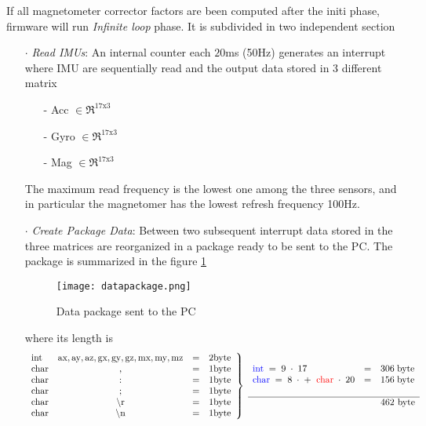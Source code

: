 If all magnetometer corrector factors are been computed after the initi phase, firmware will run \textit{Infinite loop} phase. It is subdivided in two independent section
\begin{enumerate}
\item[$\cdot$] \textit{Read IMUs}: An internal counter each $20$ms (50Hz) generates an interrupt where IMU are sequentially read and the output data stored in 3 different matrix
                          \begin{enumerate}
                          \item[-] Acc $\in \Re ^{17 \text{x} 3}$
                          \item[-] Gyro $\in \Re ^{17 \text{x} 3}$
                          \item[-] Mag $\in \Re ^{17 \text{x} 3}$
                          \end{enumerate}
                          The maximum read frequency is the lowest one among the three sensors, and in particular the magnetomer has the lowest refresh frequency 100Hz.
\item[$\cdot$] \textit{Create Package Data}:  Between two subsequent interrupt data stored in the three matrices are reorganized in a package ready to be sent to the PC. The package  is summarized in the figure \ref{fig:package}  
\begin{figure}[h]
\centering
\texttt{[image: datapackage.png]}
\caption{Data package sent to  the PC}
\label{fig:package}
\end{figure}  
 
\noindent where its length is 
\begin{equation*}
\displaystyle  \left. \begin{array}{lccc}
\text{int} & \text{ax},\text{ay},\text{az},\text{gx},\text{gy},\text{gz},\text{mx},\text{my},\text{mz}  & = & 2 \text{byte} \\
\text{char} & , & = & 1 \text{byte} \\
\text{char} & : & = & 1 \text{byte} \\
\text{char} & ; & = & 1 \text{byte} \\
\text{char} & \backslash \text{r} & = & 1 \text{byte} \\
\text{char} & \backslash \text{n} & = & 1 \text{byte}
\end{array} \right\rbrace \; 
\begin{array}{lcl}
\textcolor{blue}{\text{int}} \; = \; 9 \; \cdot \; 17 \; & = & 306 \; \text{byte} \\
\textcolor{blue}{\text{char}} \; = \; 8  \; \cdot \;+\; \; \textcolor{red}{\text{char}} \; \cdot \; 20  & = & 156 \; \text{byte}  \\ 
& & \\ \hline 
 & & \text{462 byte}
\end{array} 
\end{equation*}


\end{enumerate}
